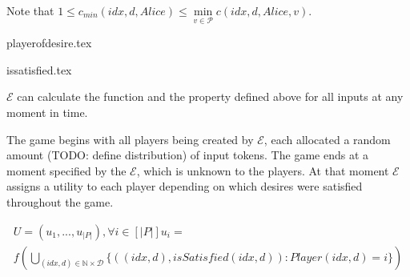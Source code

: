   \noindent Note that $1 \leq c_{min}\left(idx, d, Alice\right) \leq \min\limits_{v \in \mathcal{P}}{c\left(idx, d, Alice,
  v\right)}$.

  {playerofdesire.tex}

  {issatisfied.tex}

  $\mathcal{E}$ can calculate the function and the property defined above for all inputs at any moment in time.

  The game begins with all players being created by $\mathcal{E}$, each allocated a random amount (TODO: define distribution)
  of input tokens. The game ends at a moment specified by the $\mathcal{E}$, which is unknown to the players. At that moment
  $\mathcal{E}$ assigns a utility to each player depending on which desires were satisfied throughout the game.

  \begin{gather*}
    U = \left(u_1, ..., u_{|P|}\right), \forall i \in \left[|P|\right] u_i = \\
    f\left(\bigcup\limits_{\left(idx, d\right) \in \mathbb{N} \times \mathcal{D}}\{\left(\left(idx, d\right),
    isSatisfied\left(idx, d\right)\right) : Player\left(idx, d\right) = i\}\right)
  \end{gather*}
